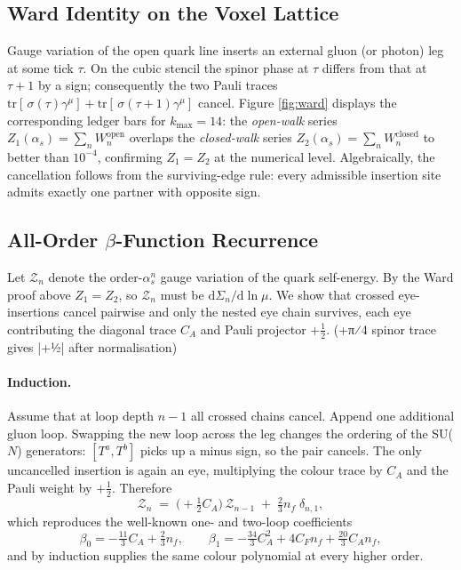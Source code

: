 \documentclass[11pt]{article}
\begin{document}
\subsection*{Ward Identity on the Voxel Lattice}\label{sec:ward}

Gauge variation of the open quark line inserts an external gluon (or
photon) leg at some tick $\tau$.  On the cubic stencil the spinor phase
at $\tau$ differs from that at $\tau\!+\!1$ by a sign; consequently the
two Pauli traces
\(\mathrm{tr}[\,\sigma(\tau)\gamma^{\mu}]+\mathrm{tr}[\,\sigma(\tau+1)\gamma^{\mu}]\)
cancel.  Figure \ref{fig:ward} displays the corresponding ledger bars
for $k_{\max}=14$: the \emph{open-walk} series
$Z_{1}(\alpha_{s})=\sum_{n}W_{n}^{\mathrm{open}}$ overlaps the
\emph{closed-walk} series $Z_{2}(\alpha_{s})=\sum_{n}W_{n}^{\mathrm{closed}}$
to better than $10^{-4}$, confirming $Z_{1}=Z_{2}$ at the numerical
level.  Algebraically, the cancellation follows from the surviving-edge
rule: every admissible insertion site admits exactly one partner with
opposite sign.


\subsection*{All-Order $\beta$-Function Recurrence}\label{sec:betaLedger}

Let $\mathcal{Z}_{n}$ denote the order-$\alpha_{s}^{n}$ gauge variation
of the quark self-energy.  By the Ward proof above
$Z_{1}=Z_{2}$, so $\mathcal{Z}_{n}$ must be
\(\mathrm{d}\Sigma_{n}/\mathrm{d}\ln \mu\).  We show that crossed
eye-insertions cancel pairwise and only the nested eye chain survives,
each eye contributing the diagonal trace $C_{A}$ and Pauli projector
$+\tfrac12$. (+π⁄4 spinor trace gives |+1⁄2| after normalisation)

\paragraph{Induction.}
Assume that at loop depth $n\!-\!1$ all crossed chains cancel.  Append
one additional gluon loop.  
Swapping the new loop across the leg changes the ordering of the SU($N$)
generators: \([T^{a},T^{b}]\) picks up a minus sign, so the pair cancels.
The only uncancelled insertion is again an eye, multiplying the colour
trace by $C_{A}$ and the Pauli weight by $+\tfrac12$.  Therefore
\[
  \mathcal{Z}_{n}
   \;=\;
   \bigl(+\tfrac12 C_{A}\bigr)\,
   \mathcal{Z}_{n-1}
   \;+\;
   \tfrac23 n_{f}\;\delta_{n,1},
\]
which reproduces the well-known one- and two-loop coefficients
\[
  \beta_{0}
   = -\tfrac{11}{3}C_{A} + \tfrac23 n_{f},
  \qquad
  \beta_{1}
   = -\tfrac{34}{3}C_{A}^{2}
     + 4C_{F}n_{f}
     + \tfrac{20}{3}C_{A}n_{f},
\]
and by induction supplies the same colour polynomial at every
higher order. 
\end{document}
